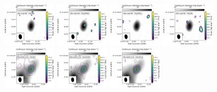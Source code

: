 \begin{figure}[htbp!]
  \centering
  \includegraphics[width=0.24\textwidth]{./moment0/Set2_ID11_CH3OH_243915.pdf}
  \includegraphics[width=0.24\textwidth]{./moment0/Set2_ID11_CH3OCHO_259342.pdf}
  \includegraphics[width=0.24\textwidth]{./moment0/Set2_ID11_CH3OCH3_259311.pdf}
  \includegraphics[width=0.24\textwidth]{./moment0/Set2_ID11_CH3CN_257527.pdf}
  \\
  \includegraphics[width=0.24\textwidth]{./moment0/Set2_ID01_2_CH3OH_243915.pdf}
  \includegraphics[width=0.24\textwidth]{./moment0/Set2_ID01_2_CH3OCHO_259342.pdf}
  \includegraphics[width=0.24\textwidth]{./moment0/Set2_ID01_2_CH3OCH3_259311.pdf}

\end{figure}
